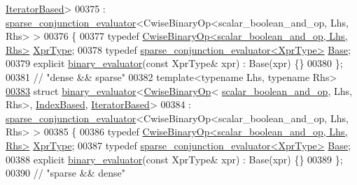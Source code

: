 \begin{DoxyCode}
      \hyperlink{struct_eigen_1_1internal_1_1_iterator_based}{IteratorBased}>
00375   : \hyperlink{struct_eigen_1_1internal_1_1sparse__conjunction__evaluator}{sparse\_conjunction\_evaluator}<CwiseBinaryOp<scalar\_boolean\_and\_op, Lhs, Rhs>
       >
00376 \{
00377   \textcolor{keyword}{typedef} \hyperlink{group___core___module_class_eigen_1_1_cwise_binary_op}{CwiseBinaryOp<scalar\_boolean\_and\_op, Lhs, Rhs>} 
      \hyperlink{group___core___module_class_eigen_1_1_cwise_binary_op}{XprType};
00378   \textcolor{keyword}{typedef} \hyperlink{struct_eigen_1_1internal_1_1sparse__conjunction__evaluator}{sparse\_conjunction\_evaluator<XprType>} 
      \hyperlink{struct_eigen_1_1internal_1_1sparse__conjunction__evaluator}{Base};
00379   \textcolor{keyword}{explicit} \hyperlink{struct_eigen_1_1internal_1_1binary__evaluator}{binary\_evaluator}(\textcolor{keyword}{const} XprType& xpr) : Base(xpr) \{\}
00380 \};
00381 \textcolor{comment}{// "dense && sparse"}
00382 \textcolor{keyword}{template}<\textcolor{keyword}{typename} Lhs, \textcolor{keyword}{typename} Rhs>
\hyperlink{struct_eigen_1_1internal_1_1binary__evaluator_3_01_cwise_binary_op_3_01scalar__boolean__and__op_e5783d1feefabf80ecedbbd659dac347}{00383} \textcolor{keyword}{struct }\hyperlink{struct_eigen_1_1internal_1_1binary__evaluator}{binary\_evaluator}<\hyperlink{group___core___module_class_eigen_1_1_cwise_binary_op}{CwiseBinaryOp}<
      \hyperlink{struct_eigen_1_1internal_1_1scalar__boolean__and__op}{scalar\_boolean\_and\_op}, Lhs, Rhs>, \hyperlink{struct_eigen_1_1internal_1_1_index_based}{IndexBased}, 
      \hyperlink{struct_eigen_1_1internal_1_1_iterator_based}{IteratorBased}>
00384   : \hyperlink{struct_eigen_1_1internal_1_1sparse__conjunction__evaluator}{sparse\_conjunction\_evaluator}<CwiseBinaryOp<scalar\_boolean\_and\_op, Lhs, Rhs>
       >
00385 \{
00386   \textcolor{keyword}{typedef} \hyperlink{group___core___module_class_eigen_1_1_cwise_binary_op}{CwiseBinaryOp<scalar\_boolean\_and\_op, Lhs, Rhs>} 
      \hyperlink{group___core___module_class_eigen_1_1_cwise_binary_op}{XprType};
00387   \textcolor{keyword}{typedef} \hyperlink{struct_eigen_1_1internal_1_1sparse__conjunction__evaluator}{sparse\_conjunction\_evaluator<XprType>} 
      \hyperlink{struct_eigen_1_1internal_1_1sparse__conjunction__evaluator}{Base};
00388   \textcolor{keyword}{explicit} \hyperlink{struct_eigen_1_1internal_1_1binary__evaluator}{binary\_evaluator}(\textcolor{keyword}{const} XprType& xpr) : Base(xpr) \{\}
00389 \};
00390 \textcolor{comment}{// "sparse && dense"}

\end{DoxyCode}
